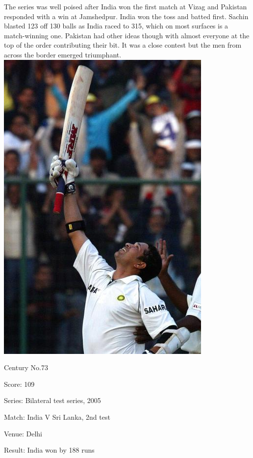 \documentclass[11pt, a4paper]{article}
\begin{document}
The series was well poised after India won the first match at Vizag and Pakistan responded with a win at Jamshedpur. India won the toss and batted first. Sachin blasted 123 off 130 balls as India raced to 315, which on most surfaces is a match-winning one. Pakistan had other ideas though with almost everyone at the top of the order contributing their bit. It was a close contest but the men from across the border emerged triumphant.
\newpage
\includegraphics[height=0.75\textheight]{pics/73.jpg}

Century No.73 

Score: 109 

Series: Bilateral test series, 2005 

Match: India V Sri Lanka, 2nd test 

Venue: Delhi 

Result: India won by 188 runs 
\end{document}
